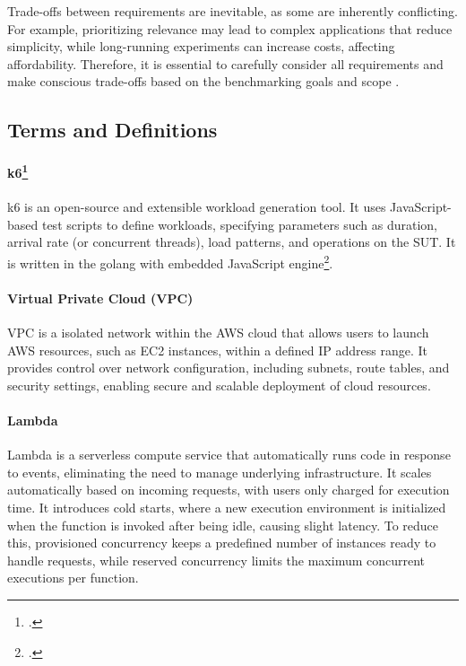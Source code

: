 Trade-offs between requirements are inevitable, as some are inherently conflicting. For example, prioritizing relevance may lead to complex applications that reduce simplicity, while long-running experiments can increase costs, affecting affordability. Therefore, it is essential to carefully consider all requirements and make conscious trade-offs based on the benchmarking goals and scope \cite{book_bermbach_cloud_service_benchmarking}.

\subsection{Terms and Definitions}
\label{challenges}

\paragraph{k6\footcite{https://k6.io/open-source/}}
k6 is an open-source and extensible workload generation tool. It uses JavaScript-based test scripts to define workloads, specifying parameters such as duration, arrival rate (or concurrent threads), load patterns, and operations on the SUT. It is written in the golang with embedded JavaScript engine\footcite{https://github.com/grafana/k6}.

\paragraph{Virtual Private Cloud (VPC)} VPC is a isolated network within the AWS cloud that allows users to launch AWS resources, such as EC2 instances, within a defined IP address range. It provides control over network configuration, including subnets, route tables, and security settings, enabling secure and scalable deployment of cloud resources.


\paragraph{Lambda}
Lambda is a serverless compute service that automatically runs code in response to events, eliminating the need to manage underlying infrastructure. It scales automatically based on incoming requests, with users only charged for execution time. It introduces cold starts, where a new execution environment is initialized when the function is invoked after being idle, causing slight latency. To reduce this, provisioned concurrency keeps a predefined number of instances ready to handle requests, while reserved concurrency limits the maximum concurrent executions per function.


